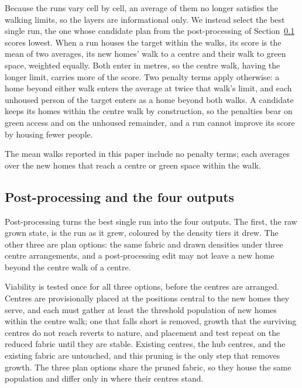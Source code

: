 \documentclass[11pt]{article}
\begin{document}
Because the runs vary cell by cell, an average of them no longer
satisfies the walking limits, so the layers are informational only. We instead select the
best single run, the one whose candidate plan from the
post-processing of Section~\ref{sec:fouroutputs} scores lowest.
When a run houses the target within the walks, its score is the
mean of two averages, its new homes' walk to a centre and their walk
to green space, weighted equally. Both enter in metres, so the centre
walk, having the longer limit, carries more of the score. Two penalty terms apply otherwise: a home beyond
either walk enters the average at twice that walk's limit, and
each unhoused person of the target enters as a home beyond both
walks. A candidate keeps its homes within the centre walk by
construction, so the penalties bear on green access and on the
unhoused remainder, and a run cannot improve its score by housing
fewer people.

The mean walks reported in this paper include no penalty terms;
each averages over the new homes that reach a centre or green
space within the walk.

\subsection{Post-processing and the four outputs}
\label{sec:fouroutputs}

Post-processing turns the best single run into the four outputs.
The first, the raw grown state, is the run as it grew,
coloured by the density tiers it drew. The other three are plan
options: the same fabric and drawn densities under three centre
arrangements, and a post-processing edit may not leave a new home
beyond the centre walk of a centre.

Viability is tested once for all three options, before the centres
are arranged. Centres
are provisionally placed at the positions central to the new homes
they serve, and each must gather at least the threshold population
of new homes within the centre walk; one that falls short is
removed, growth that the surviving centres do not reach reverts to nature,
and placement and test repeat on the reduced fabric until they are
stable. Existing centres, the hub centres, and the existing fabric
are untouched, and this pruning is the only step that removes
growth. The three plan options share the pruned fabric, so they
house the same population and differ only in where their centres
stand.
\end{document}
